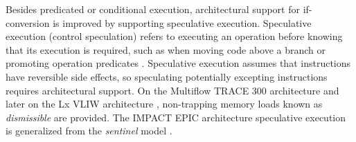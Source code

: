 Besides predicated or conditional execution, architectural support for
if-conversion is improved by supporting speculative execution. Speculative
execution (control speculation) refers to executing an operation before knowing
that its execution is required, such as when moving code above a branch
\cite{Lowney:1993:JS} or promoting operation predicates \cite{Mahlke:1995:ISCA}.
Speculative execution assumes that instructions have reversible side effects, so
speculating potentially excepting instructions requires architectural support.
On the Multiflow TRACE 300 architecture and later on the Lx VLIW architecture
\cite{Faraboschi:2000:ISCA}, non-trapping memory loads known as
\emph{dismissible} are provided. The IMPACT EPIC architecture speculative
execution \cite{August:1998:ISCA} is generalized from the \emph{sentinel} model
\cite{Mahlke:1992:ASPLOS}.

